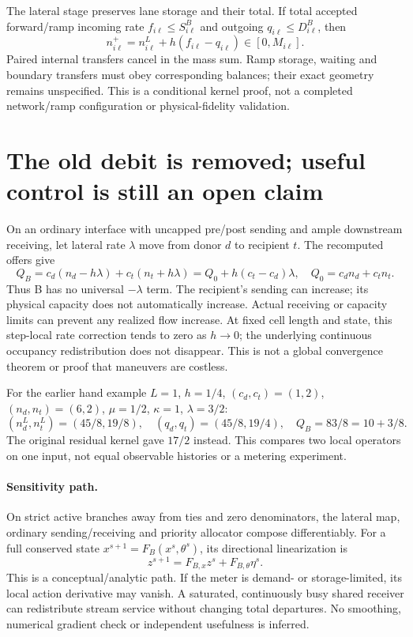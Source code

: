 \documentclass[10pt,a4paper]{article}
\begin{document}
The lateral stage preserves lane storage and their total. If total accepted
forward/ramp incoming rate $f_{i\ell}\leq S_{i\ell}^B$ and outgoing
$q_{i\ell}\leq D_{i\ell}^B$, then
\begin{equation}
n_{i\ell}^{+}=n_{i\ell}^L+h(f_{i\ell}-q_{i\ell})\in[0,M_{i\ell}].
\end{equation}
Paired internal transfers cancel in the mass sum. Ramp storage, waiting and
boundary transfers must obey corresponding balances; their exact geometry
remains unspecified. This is a conditional kernel proof, not a completed
network/ramp configuration or physical-fidelity validation.
\newpage

\section{The old debit is removed; useful control is still an open claim}
On an ordinary interface with uncapped pre/post sending and ample downstream
receiving, let lateral rate $\lambda$ move from donor $d$ to recipient $t$.
The recomputed offers give
\begin{equation}
Q_B=c_d(n_d-h\lambda)+c_t(n_t+h\lambda)
=Q_0+h(c_t-c_d)\lambda,\quad Q_0=c_d n_d+c_t n_t.
\end{equation}
Thus B has no universal $-\lambda$ term. The recipient's sending can increase;
its physical capacity does not automatically increase. Actual receiving or
capacity limits can prevent any realized flow increase.
At fixed cell length and state, this step-local rate correction tends to zero
as $h\to0$; the underlying continuous occupancy redistribution does not disappear.
This is not a global convergence theorem or proof that maneuvers are costless.

For the earlier hand example $L=1$, $h=1/4$, $(c_d,c_t)=(1,2)$,
$(n_d,n_t)=(6,2)$, $\mu=1/2$, $\kappa=1$, $\lambda=3/2$:
\begin{equation}
(n_d^L,n_t^L)=(45/8,19/8),\quad
(q_d,q_t)=(45/8,19/4),\quad Q_B=83/8=10+3/8.
\end{equation}
The original residual kernel gave $17/2$ instead. This compares two local
operators on one input, not equal observable histories or a metering experiment.

\paragraph{Sensitivity path.}
On strict active branches away from ties and zero denominators, the lateral
map, ordinary sending/receiving and priority allocator compose differentiably.
For a full conserved state $x^{s+1}=F_B(x^s,\theta^s)$, its directional
linearization is
\begin{equation}
z^{s+1}=F_{B,x}z^s+F_{B,\theta}\eta^s.
\end{equation}
This is a conceptual/analytic path. If the meter is demand- or storage-limited,
its local action derivative may vanish. A saturated, continuously busy shared
receiver can redistribute stream service without changing total departures.
No smoothing, numerical gradient check or independent usefulness is inferred.
\end{document}
